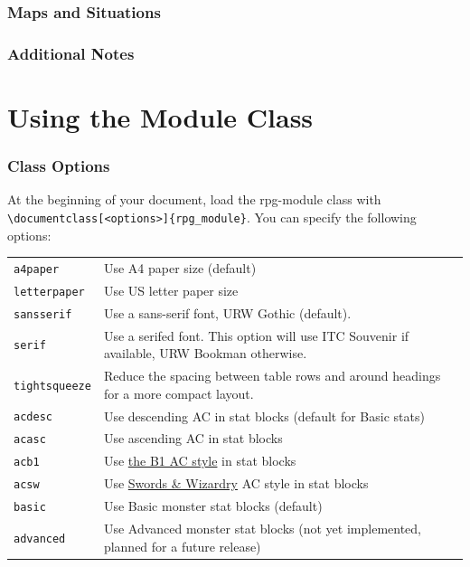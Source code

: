 \documentclass[letterpaper,serif]{rpg-module}
\begin{document}
\section{Maps and Situations}

\section{Additional Notes}

\pagebreak

\part{Using the Module Class}
\label{using_the_module_class}

\section{Class Options}

At the beginning of your document, load the rpg-module class with \verb|\documentclass[<options>]{rpg_module}|. You can
specify the following options:

\begin{tabularx}{\linewidth}{lX}
\verb|a4paper|      & Use A4 paper size (default)\\
\verb|letterpaper|  & Use US letter paper size\\
\verb|sansserif|    & Use a sans-serif font, URW Gothic (default).\\
\verb|serif|        & Use a serifed font. This option will use ITC Souvenir if available, URW Bookman otherwise.\\
\verb|tightsqueeze| & Reduce the spacing between table rows and around headings for a more compact layout.\\
\verb|acdesc|       & Use descending AC in stat blocks (default for Basic stats)\\
\verb|acasc|        & Use ascending AC in stat blocks\\
\verb|acb1|         & Use \href{http://zenopusarchives.blogspot.com/2014/02/ascending-ac-in-holmes-basic.html}{the B1 AC style} in stat blocks\\
\verb|acsw|         & Use \href{http://www.swordsandwizardry.com/}{Swords \& Wizardry} AC style in stat blocks\\
\verb|basic|        & Use Basic monster stat blocks (default)\\
\verb|advanced|     & Use Advanced monster stat blocks (not yet implemented, planned for a future release)\\
\end{tabularx}
\end{document}
